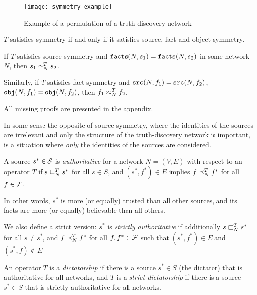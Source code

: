 \documentclass[../main.tex]{subfiles}
\begin{document}
\begin{figure}
    \centering
    \texttt{[image: symmetry\_example]}
    \caption{Example of a permutation of a truth-discovery network}
    \label{img:permutation_of_a_tdn}
\end{figure}

\begin{proposition}
\label{prop:symm_iff_fact_source_object_symm}
$T$ satisfies symmetry if and only if it satisfies source, fact and object
symmetry.
\end{proposition}

\begin{proposition}
\label{prop:same_facts_ranked_equally}
If $T$ satisfies source-symmetry and $\fact(N, s_1) = \fact(N, s_2)$ in some
network $N$, then $s_1 \seq_N^T s_2$.

Similarly, if $T$ satisfies fact-symmetry and $\src(N, f_1) = \src(N, f_2)$,
$\obj(N, f_1) = \obj(N, f_2)$, then $f_1 \feq_N^T f_2$.
\end{proposition}

All missing proofs are presented in the appendix.

In some sense the opposite of source-symmetry, where the identities of the
sources are irrelevant and only the structure of the truth-discovery network is
important, is a situation where \emph{only} the identities of the sources are
considered.

\begin{definition}

A source $s^* \in \S$ is \emph{authoritative} for a network $N=(V, E)$ with
respect to an operator $T$ if $s \sle_N^T s^*$ for all $s \in S$, and $(s^*,
f^*) \in E$ implies $f \fle_N^T f^*$ for all $f \in \F$.

In other words, $s^*$ is more (or equally) trusted than all other sources, and
its facts are more (or equally) believable than all others.

We also define a strict version: $s^*$ is \emph{strictly authoritative} if
additionally $s \slt_N^T s^*$ for all $s \ne s^*$, and $f \flt_N^T f^*$ for all
$f, f^* \in \F$ such that $(s^*, f^*) \in E$ and $(s^*, f) \notin E$.

An operator $T$ is a \emph{dictatorship} if there is a source $s^* \in S$ (the
dictator) that is authoritative for all networks, and $T$ is a \emph{strict
dictatorship} if there is a source $s^* \in S$ that is strictly authoritative
for all networks.

\end{definition}
\end{document}
